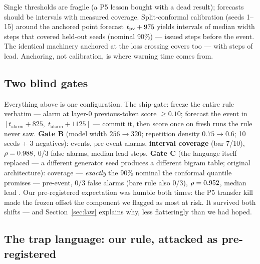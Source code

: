 \documentclass[11pt]{article}
\newcommand{\tpv}{t_{\mathrm{pv}}}
\begin{document}
Single thresholds are fragile (a P5 lesson bought with a dead result); forecasts should
be intervals with measured coverage. Split-conformal calibration (seeds 1--15) around
the anchored point forecast $\tpv + \wConfDelta$ yields intervals of median width
\wConfWidth{} steps that covered \wConfCover{} held-out seeds (nominal 90\%) --- issued
\wConfDelta{} steps before the event. The identical machinery anchored at the loss
crossing covers too --- with \wLossConfLead{} steps of lead. Anchoring, not calibration,
is where warning time comes from.

\subsection{Two blind gates}
\label{sec:gate}

Everything above is one configuration. The ship-gate: freeze the entire rule verbatim
--- alarm at layer-0 previous-token score $\geq 0.10$; forecast the event in
$[t_{\mathrm{alarm}} + 825,\; t_{\mathrm{alarm}} + 1125]$ --- commit it, then score once
on fresh runs the rule never saw. \textbf{Gate B} (model width $256 \to 320$; repetition
density $0.75 \to 0.6$; 10 seeds + 3 negatives): \wGateEvents{} events, \wGatePre{}
pre-event alarms, \textbf{\wGateCover{} interval coverage} (bar 7/10), $\rho =
0.988$, 0/3 false alarms, median lead \wGateLeadMed{} steps. \textbf{Gate C}
(the language itself replaced --- a different generator seed produces a different
bigram table; original architecture): \wGateCcover{} coverage --- \emph{exactly} the
90\% nominal the conformal quantile promises --- \wGateCpre{} pre-event, 0/3 false
alarms (bare rule also 0/3), $\rho = 0.952$, median lead \wGateCleadMed. Our
pre-registered expectation was humble both times: the P5 transfer kill made the frozen
offset the component we flagged as most at risk. It survived both shifts --- and
Section~\ref{sec:law} explains why, less flatteringly than we had hoped.

\subsection{The trap language: our rule, attacked as pre-registered}
\label{sec:trap}
\end{document}
